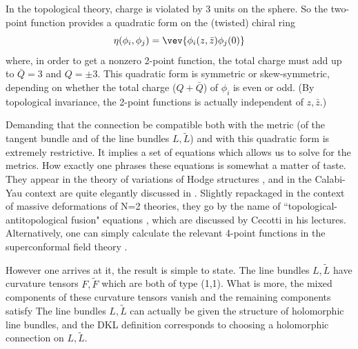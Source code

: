 In the topological theory, charge is violated by 3 units on the sphere. So
the two-point function provides a quadratic form on the (twisted) chiral ring
$$\eta(\phi_i,\phi_j)=\vev{\phi_i(z,\bar z)\phi_j(0)}$$
where, in order to get a nonzero 2-point function, the total charge must add up
to $\bar Q=3$ and $Q=\pm3$. This quadratic form is symmetric or
skew-symmetric, depending on whether the total charge
($Q+\bar
Q$) of $\phi_i$
 is even or odd. (By topological invariance, the 2-point functions is
actually independent of $z,\bar z$.)

Demanding that the connection be compatible both with the metric (of the
tangent bundle and of the line bundles $L,\tilde L$) and with this quadratic
form is extremely restrictive. It implies a set of equations which allows us
to solve for the metrics. How exactly one phrases these equations is somewhat
a matter of taste. They appear in the theory of variations of Hodge
structures \Hodge, and in the Calabi-Yau context are quite elegantly discussed
in \StromSpec. Slightly repackaged in the context of massive deformations of
N=2 theories, they go by the name of ``topological-antitopological fusion"
equations \TopAntiTop, which are discussed by Cecotti in his lectures.
Alternatively, one can simply calculate the relevant 4-point functions in the
superconformal field theory \DKL.

However one arrives at it, the result is simple to state. The line bundles
$L,\tilde L$ have curvature tensors $F,\tilde F$ which are both of type (1,1).
What is more, the mixed components of these curvature tensors vanish
\eqn{}
and the remaining components satisfy
\eqn{}
The line bundles $L,\tilde L$ can actually be given the structure of
holomorphic line bundles, and the DKL definition corresponds to choosing a
holomorphic connection on $L,\tilde L$.

